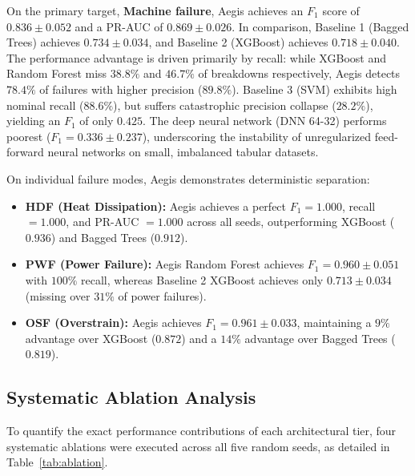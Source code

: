 \documentclass[conference]{IEEEtran}
\begin{document}
On the primary target, \textbf{Machine failure}, Aegis achieves an $F_1$ score of $0.836 \pm 0.052$ and a PR-AUC of $0.869 \pm 0.026$. In comparison, Baseline 1 (Bagged Trees) achieves $0.734 \pm 0.034$, and Baseline 2 (XGBoost) achieves $0.718 \pm 0.040$. The performance advantage is driven primarily by recall: while XGBoost and Random Forest miss $38.8\%$ and $46.7\%$ of breakdowns respectively, Aegis detects $78.4\%$ of failures with higher precision ($89.8\%$). Baseline 3 (SVM) exhibits high nominal recall ($88.6\%$), but suffers catastrophic precision collapse ($28.2\%$), yielding an $F_1$ of only $0.425$. The deep neural network (DNN 64-32) performs poorest ($F_1 = 0.336 \pm 0.237$), underscoring the instability of unregularized feed-forward neural networks on small, imbalanced tabular datasets.

On individual failure modes, Aegis demonstrates deterministic separation:
\begin{itemize}
    \item \textbf{HDF (Heat Dissipation):} Aegis achieves a perfect $F_1 = 1.000$, recall $= 1.000$, and PR-AUC $= 1.000$ across all seeds, outperforming XGBoost ($0.936$) and Bagged Trees ($0.912$).
    \item \textbf{PWF (Power Failure):} Aegis Random Forest achieves $F_1 = 0.960 \pm 0.051$ with $100\%$ recall, whereas Baseline 2 XGBoost achieves only $0.713 \pm 0.034$ (missing over $31\%$ of power failures).
    \item \textbf{OSF (Overstrain):} Aegis achieves $F_1 = 0.961 \pm 0.033$, maintaining a $9\%$ advantage over XGBoost ($0.872$) and a $14\%$ advantage over Bagged Trees ($0.819$).
\end{itemize}

\subsection{Systematic Ablation Analysis}
To quantify the exact performance contributions of each architectural tier, four systematic ablations were executed across all five random seeds, as detailed in Table~\ref{tab:ablation}.
\end{document}
